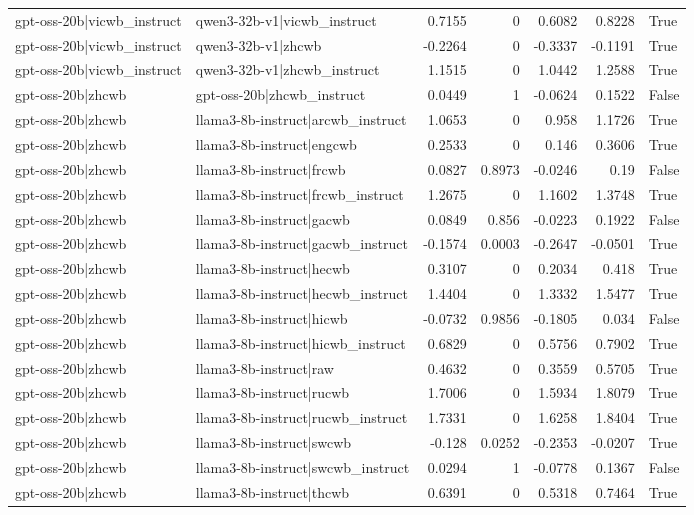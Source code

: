 \begin{table}
\begin{tabular}{l l r r r r l}
gpt-oss-20b|vicwb_instruct & qwen3-32b-v1|vicwb_instruct & 0.7155 & 0 & 0.6082 & 0.8228 & True \\
gpt-oss-20b|vicwb_instruct & qwen3-32b-v1|zhcwb & -0.2264 & 0 & -0.3337 & -0.1191 & True \\
gpt-oss-20b|vicwb_instruct & qwen3-32b-v1|zhcwb_instruct & 1.1515 & 0 & 1.0442 & 1.2588 & True \\
gpt-oss-20b|zhcwb & gpt-oss-20b|zhcwb_instruct & 0.0449 & 1 & -0.0624 & 0.1522 & False \\
gpt-oss-20b|zhcwb & llama3-8b-instruct|arcwb_instruct & 1.0653 & 0 & 0.958 & 1.1726 & True \\
gpt-oss-20b|zhcwb & llama3-8b-instruct|engcwb & 0.2533 & 0 & 0.146 & 0.3606 & True \\
gpt-oss-20b|zhcwb & llama3-8b-instruct|frcwb & 0.0827 & 0.8973 & -0.0246 & 0.19 & False \\
gpt-oss-20b|zhcwb & llama3-8b-instruct|frcwb_instruct & 1.2675 & 0 & 1.1602 & 1.3748 & True \\
gpt-oss-20b|zhcwb & llama3-8b-instruct|gacwb & 0.0849 & 0.856 & -0.0223 & 0.1922 & False \\
gpt-oss-20b|zhcwb & llama3-8b-instruct|gacwb_instruct & -0.1574 & 0.0003 & -0.2647 & -0.0501 & True \\
gpt-oss-20b|zhcwb & llama3-8b-instruct|hecwb & 0.3107 & 0 & 0.2034 & 0.418 & True \\
gpt-oss-20b|zhcwb & llama3-8b-instruct|hecwb_instruct & 1.4404 & 0 & 1.3332 & 1.5477 & True \\
gpt-oss-20b|zhcwb & llama3-8b-instruct|hicwb & -0.0732 & 0.9856 & -0.1805 & 0.034 & False \\
gpt-oss-20b|zhcwb & llama3-8b-instruct|hicwb_instruct & 0.6829 & 0 & 0.5756 & 0.7902 & True \\
gpt-oss-20b|zhcwb & llama3-8b-instruct|raw & 0.4632 & 0 & 0.3559 & 0.5705 & True \\
gpt-oss-20b|zhcwb & llama3-8b-instruct|rucwb & 1.7006 & 0 & 1.5934 & 1.8079 & True \\
gpt-oss-20b|zhcwb & llama3-8b-instruct|rucwb_instruct & 1.7331 & 0 & 1.6258 & 1.8404 & True \\
gpt-oss-20b|zhcwb & llama3-8b-instruct|swcwb & -0.128 & 0.0252 & -0.2353 & -0.0207 & True \\
gpt-oss-20b|zhcwb & llama3-8b-instruct|swcwb_instruct & 0.0294 & 1 & -0.0778 & 0.1367 & False \\
gpt-oss-20b|zhcwb & llama3-8b-instruct|thcwb & 0.6391 & 0 & 0.5318 & 0.7464 & True \\

\end{tabular}
\end{table}
